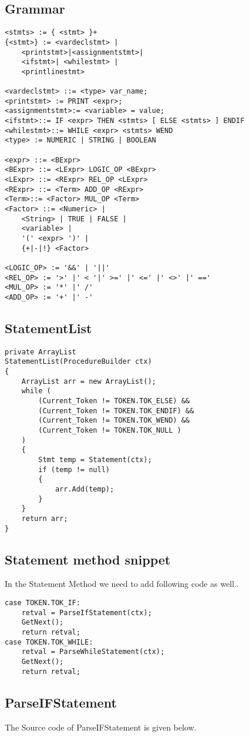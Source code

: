 \subsection{Grammar}
\lstset{style=csharp}
\begin{lstlisting}
<stmts> := { <stmt> }+
{<stmt>} := <vardeclstmt> |
	<printstmt>|<assignmentstmt>|
	<ifstmt>| <whilestmt> |
	<printlinestmt>

<vardeclstmt> ::= <type> var_name;
<printstmt> := PRINT <expr>;
<assignmentstmt>:= <variable> = value;
<ifstmt>::= IF <expr> THEN <stmts> [ ELSE <stmts> ] ENDIF
<whilestmt>::= WHILE <expr> <stmts> WEND
<type> := NUMERIC | STRING | BOOLEAN

<expr> ::= <BExpr>
<BExpr> ::= <LExpr> LOGIC_OP <BExpr>
<LExpr> ::= <RExpr> REL_OP <LExpr>
<RExpr> ::= <Term> ADD_OP <RExpr>
<Term>::= <Factor> MUL_OP <Term>
<Factor> ::= <Numeric> |
	<String> | TRUE | FALSE | 
	<variable> |
	'(' <expr> ')' |
	{+|-|!} <Factor>

<LOGIC_OP> := '&&' | '||'
<REL_OP> := '>' |' < '|' >=' |' <=' |' <>' |' =='
<MUL_OP> := '*' |' /'
<ADD_OP> := '+' |' -'
\end{lstlisting}

\subsection{StatementList}
\lstset{style=csharp}
\begin{lstlisting}
private ArrayList 
StatementList(ProcedureBuilder ctx)
{
	ArrayList arr = new ArrayList();
	while (
		(Current_Token != TOKEN.TOK_ELSE) &&
		(Current_Token != TOKEN.TOK_ENDIF) &&
		(Current_Token != TOKEN.TOK_WEND) &&
		(Current_Token != TOKEN.TOK_NULL )
	)
	{
		Stmt temp = Statement(ctx);
		if (temp != null)
		{
			arr.Add(temp);
		}
	}
	return arr;
}
\end{lstlisting}
\subsection{Statement method snippet}
In the Statement Method we need to add following code as well..
\lstset{style=csharp}
\begin{lstlisting}
case TOKEN.TOK_IF:
	retval = ParseIfStatement(ctx);
	GetNext();
	return retval;
case TOKEN.TOK_WHILE:
	retval = ParseWhileStatement(ctx);
	GetNext();
	return retval;
\end{lstlisting}
\subsection{ParseIFStatement}
The Source code of ParseIFStatement is given below.

